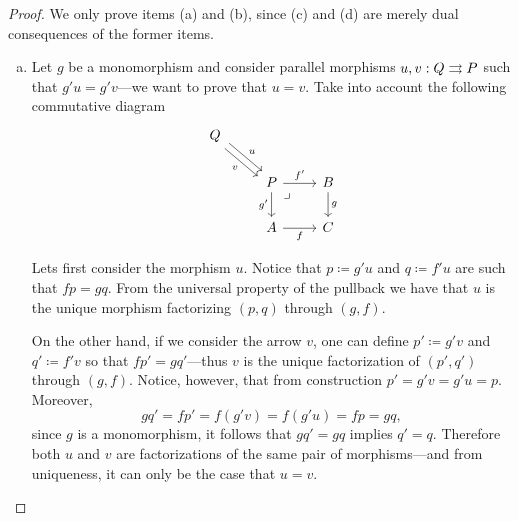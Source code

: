 \begin{proof}
    We only prove items (a) and (b), since (c) and (d) are merely dual consequences
    of the former items.
    \begin{enumerate}[(a)]\setlength\itemsep{0em}
        \item Let \(g\) be a monomorphism and consider parallel morphisms \(u, v: Q
              \rightrightarrows P\) such that \(g' u = g' v\)---we want to prove that \(u = v\). Take
              into account the following commutative diagram
              \[
                  \begin{tikzcd}
                      Q \ar[rd, shift left, "u"] \ar[rd, shift right, "v"'] & & \\
                      &P \ar[r, "f'"] \ar[d, "g'"']
                      \ar[rd, phantom, very near start, "\lrcorner"]
                      &B \ar[d, "g"] \\
                      &A \ar[r, "f"'] &C
                  \end{tikzcd}
              \]

              Lets first consider the morphism \(u\). Notice that \(p \coloneq g' u\) and
              \(q \coloneq f' u\) are such that \(f p = g q\). From the universal property
              of the pullback we have that \(u\) is the unique morphism factorizing
              \((p, q)\) through \((g, f)\).

              On the other hand, if we consider the arrow \(v\), one can define
              \(p' \coloneq g' v\) and \(q' \coloneq f' v\) so that \(f p' = g q'\)---thus
              \(v\) is the unique factorization of \((p', q')\) through \((g, f)\). Notice,
              however, that from construction \(p' = g' v = g' u = p\). Moreover,
              \[
                  g q' = f p' = f (g' v) = f (g' u) = f p = g q,
              \]
              since \(g\) is a monomorphism, it follows that \(g q' = g q\) implies
              \(q' = q\). Therefore both \(u\) and \(v\) are factorizations of the same pair
              of morphisms---and from uniqueness, it can only be the case that \(u = v\).


\end{enumerate}
\end{proof}
